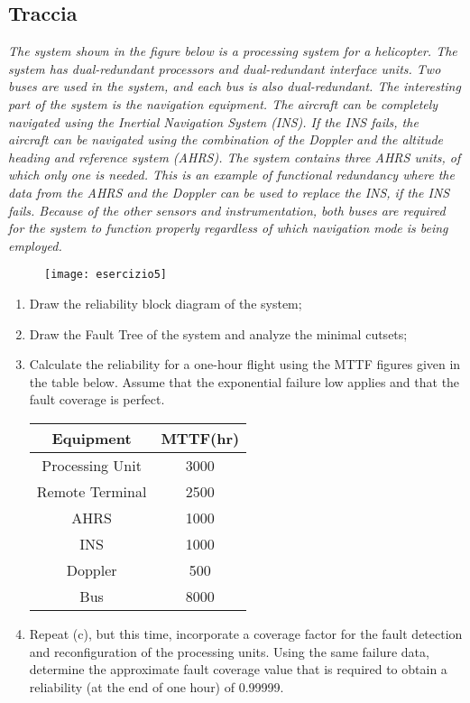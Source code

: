 \subsection{Traccia}
\textit{The system shown in the figure below is a processing system for a helicopter. The system
has dual-redundant processors and dual-redundant interface units. Two buses are used in
the system, and each bus is also dual-redundant. The interesting part of the system is the
navigation equipment. The aircraft can be completely navigated using the Inertial
Navigation System (INS). If the INS fails, the aircraft can be navigated using the
combination of the Doppler and the altitude heading and reference system (AHRS). The
system contains three AHRS units, of which only one is needed. This is an example of
functional redundancy where the data from the AHRS and the Doppler can be used to
replace the INS, if the INS fails. Because of the other sensors and instrumentation, both
buses are required for the system to function properly regardless of which navigation mode
is being employed.}

\begin{figure}[!htbp]
  \centering
  \texttt{[image: esercizio5]}
  \label{esericizo5}
\end{figure}

\begin{enumerate}
  \item Draw the reliability block diagram of the system;
  \item Draw the Fault Tree of the system and analyze the minimal cutsets;
  \item Calculate the reliability for a one-hour flight using the MTTF figures given in the table
  below. Assume that the exponential failure low applies and that the fault coverage is perfect.

  \begin{center}
  \begin{tabular}{|c|c|}
  	\hline
  	\textbf{Equipment} & \textbf{MTTF(hr)} \\
  	\hline
  	Processing Unit  & 3000 \\
  	\hline
  	Remote Terminal  & 2500 \\
  	\hline
  	AHRS & 1000 \\
  	\hline
  	INS & 1000 \\
  	\hline
  	Doppler & 500 \\
  	\hline
  	Bus & 8000 \\
  	\hline
  \end{tabular}
  \end{center}

  \item Repeat (c), but this time, incorporate a coverage factor for the fault
  detection and reconfiguration of the processing units. Using the same failure
  data, determine the approximate fault coverage value that is required to obtain
  a reliability (at the end of one hour) of 0.99999.
\end{enumerate}

